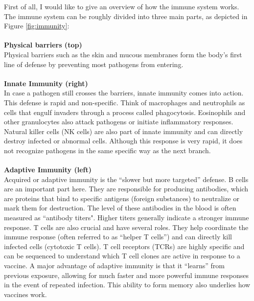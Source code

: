 \documentclass[12pt,a4paper]{report}
\begin{document}
First of all, I would like to give an overview of how the immune system works. The immune system can be roughly divided into three main parts, as depicted in Figure \ref{fig:immunity}:\\
\\
\textbf{Physical barriers (top)}\\
Physical barriers such as the skin and mucous membranes form the body’s first line of defense by preventing most pathogens from entering.\\
\\
\textbf{Innate Immunity (right)}\\
In case a pathogen still crosses the barriers, innate immunity comes into action. This defense is rapid and non-specific. Think of macrophages and neutrophils as cells that engulf invaders through a process called phagocytosis. Eosinophils and other granulocytes also attack pathogens or initiate inflammatory responses. Natural killer cells (NK cells) are also part of innate immunity and can directly destroy infected or abnormal cells. Although this response is very rapid, it does not recognize pathogens in the same specific way as the next branch. \cite{janeway2001immunobiology}\\
\\
\textbf{Adaptive Immunity (left)}\\
Acquired or adaptive immunity is the “slower but more targeted” defense. B cells are an important part here. They are responsible for producing antibodies, which are proteins that bind to specific antigens (foreign substances) to neutralize or mark them for destruction. The level of these antibodies in the blood is often measured as “antibody titers". Higher titers generally indicate a stronger immune response. T cells are also crucial and have several roles. They help coordinate the immune response (often referred to as “helper T cells”) and can directly kill infected cells (cytotoxic T cells). T cell receptors (TCRs) are highly specific and can be sequenced to understand which T cell clones are active in response to a vaccine. A major advantage of adaptive immunity is that it “learns” from previous exposure, allowing for much faster and more powerful immune responses in the event of repeated infection. This ability to form memory also underlies how vaccines work. \cite{janeway2001immunobiology}\\
\\
\end{document}
